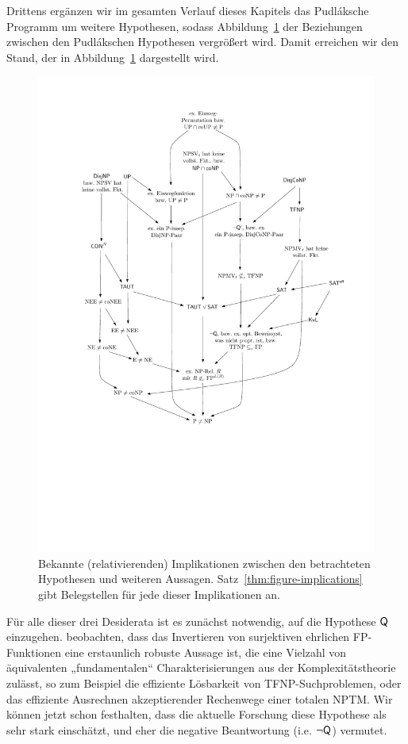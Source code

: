 Drittens ergänzen wir im gesamten Verlauf dieses Kapitels das Pudláksche Programm um weitere Hypothesen, sodass Abbildung~\ref{fig:figure-implications} der Beziehungen zwischen den Pudlákschen Hypothesen vergrößert wird. Damit erreichen wir den Stand, der in Abbildung~\ref{fig:figure-implications} dargestellt wird.


\begin{figure}
    \hspace*{-12mm}\includegraphics[page=1]{figures.pdf}
    \caption{Bekannte (relativierenden) Implikationen zwischen den betrachteten Hypothesen und weiteren Aussagen. Satz~\ref{thm:figure-implications} gibt Belegstellen für jede dieser Implikationen an.}\label{fig:figure-implications}
\end{figure}

Für alle dieser drei Desiderata ist es zunächst notwendig, auf die Hypothese $\mathsf{Q}$ einzugehen.
\textcite{fenner_inverting_2003} beobachten, dass das Invertieren von surjektiven ehrlichen FP-Funktionen eine erstaunlich robuste Aussage ist, die eine Vielzahl von äquivalenten „fundamentalen“ \parencite{fenner_inverting_2003} Charakterisierungen aus der Komplexitätstheorie zulässt, so zum Beispiel die effiziente Lösbarkeit von TFNP-Suchproblemen, oder das effiziente Ausrechnen akzeptierender Rechenwege einer totalen NPTM. Wir können jetzt schon festhalten, dass die aktuelle Forschung diese Hypothese als sehr stark einschätzt, und eher die negative Beantwortung (i.e. $\neg\mathsf{Q}$) vermutet.


